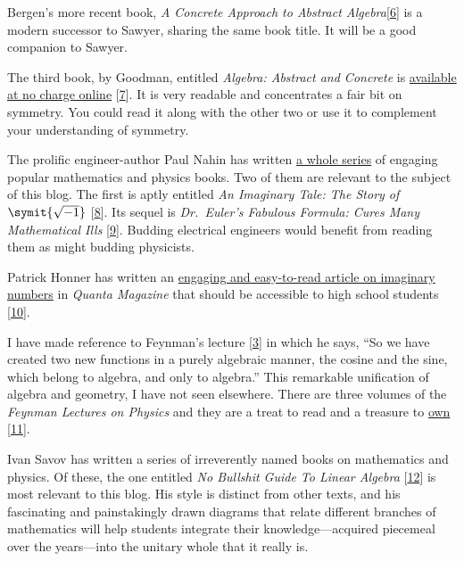 \documentclass[
  a4paper,
]{article}
\begin{document}
Bergen's more recent book, \emph{A Concrete Approach to Abstract
Algebra}{[}\protect\hyperlink{ref-bergen2010}{6}{]} is a modern
successor to Sawyer, sharing the same book title. It will be a good
companion to Sawyer.

The third book, by Goodman, entitled \emph{Algebra: Abstract and
Concrete} is
\href{http://homepage.divms.uiowa.edu/~goodman/algebrabook.dir/book.2.6.pdf}{available
at no charge online} {[}\protect\hyperlink{ref-goodman2012}{7}{]}. It is
very readable and concentrates a fair bit on symmetry. You could read it
along with the other two or use it to complement your understanding of
symmetry.

The prolific engineer-author Paul Nahin has written
\href{https://www.amazon.in/stores/Paul-J.-Nahin/author/B001HCS1XI/allbooks}{a
whole series} of engaging popular mathematics and physics books. Two of
them are relevant to the subject of this blog. The first is aptly
entitled \emph{An Imaginary Tale: The Story of \(\symit{\sqrt{-1}}\)}
{[}\protect\hyperlink{ref-nahin-imaginary}{8}{]}. Its sequel is
\emph{Dr.~Euler's Fabulous Formula: Cures Many Mathematical Ills}
{[}\protect\hyperlink{ref-nahin-euler}{9}{]}. Budding electrical
engineers would benefit from reading them as might budding physicists.

Patrick Honner has written an
\href{https://www.quantamagazine.org/the-imaginary-numbers-at-the-edge-of-reality-20181025/}{engaging
and easy-to-read article on imaginary numbers} in \emph{Quanta Magazine}
that should be accessible to high school students
{[}\protect\hyperlink{ref-honner2018}{10}{]}.

I have made reference to Feynman's lecture
{[}\protect\hyperlink{ref-feynman22}{3}{]} in which he says, ``So we
have created two new functions in a purely algebraic manner, the cosine
and the sine, which belong to algebra, and only to algebra.'' This
remarkable unification of algebra and geometry, I have not seen
elsewhere. There are three volumes of the \emph{Feynman Lectures on
Physics} and they are a treat to read and a treasure to
\href{https://www.amazon.in/Feynman-Lectures-Physics-Vol-Bundle/dp/9332580952}{own}
{[}\protect\hyperlink{ref-feynman123}{11}{]}.

Ivan Savov has written a series of irreverently named books on
mathematics and physics. Of these, the one entitled \emph{No Bullshit
Guide To Linear Algebra} {[}\protect\hyperlink{ref-savov2020}{12}{]} is
most relevant to this blog. His style is distinct from other texts, and
his fascinating and painstakingly drawn diagrams that relate different
branches of mathematics will help students integrate their
knowledge---acquired piecemeal over the years---into the unitary whole
that it really is.
\end{document}
